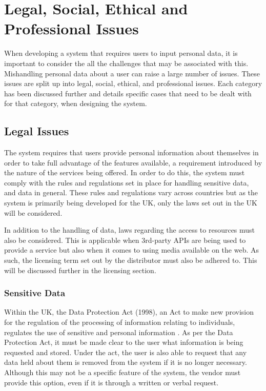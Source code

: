 \section{Legal, Social, Ethical and Professional Issues}
When developing a system that requires users to input personal data, it is important to consider the all the challenges that may be associated with this. Mishandling personal data about a user can raise a large number of issues. These issues are split up into legal, social, ethical, and professional issues. Each category has been discussed further and details specific cases that need to be dealt with for that category, when designing the system.

\subsection{Legal Issues} \label{Section:Legal_Issues}
The system requires that users provide personal information about themselves in order to take full advantage of the features available, a requirement introduced by the nature of the services being offered. In order to do this, the system must comply with the rules and regulations set in place for handling sensitive data, and data in general. These rules and regulations vary across countries but as the system is primarily being developed for the UK, only the laws set out in the UK will be considered.

In addition to the handling of data, laws regarding the access to resources must also be considered. This is applicable when 3rd-party APIs are being used to provide a service but also when it comes to using media available on the web. As such, the licensing term set out by the distributor must also be adhered to. This will be discussed further in the licensing section.

\subsubsection{Sensitive Data}
Within the UK, the Data Protection Act (1998), an Act to make new provision for the regulation of the processing of information relating to individuals, regulates the use of sensitive and personal information \cite{Legislation:DataProtectionAct}. As per the Data Protection Act, it must be made clear to the user what information is being requested and stored. Under the act, the user is also able to request that any data held about them is removed from the system if it is no longer necessary. Although this may not be a specific feature of the system, the vendor must provide this option, even if it is through a written or verbal request.

